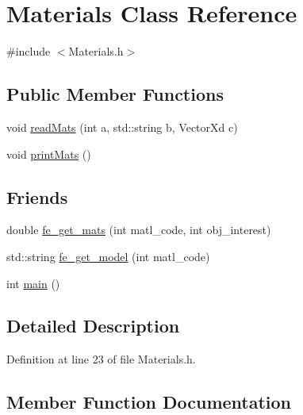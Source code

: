 \hypertarget{class_materials}{}\section{Materials Class Reference}
\label{class_materials}


{\ttfamily \#include $<$Materials.\+h$>$}

\subsection*{Public Member Functions}
\begin{DoxyCompactItemize}
\item 
void \hyperlink{class_materials_a06e59a5742730b2292d39b7488523505}{read\+Mats} (int a, std\+::string b, Vector\+Xd c)
\item 
void \hyperlink{class_materials_acce0e8fc2993ca136273747fd75b8fc1}{print\+Mats} ()
\end{DoxyCompactItemize}
\subsection*{Friends}
\begin{DoxyCompactItemize}
\item 
double \hyperlink{class_materials_af7ffbad6dfcc99fc88b130c1a7b1720a}{fe\+\_\+get\+\_\+mats} (int matl\+\_\+code, int obj\+\_\+interest)
\item 
std\+::string \hyperlink{class_materials_a34d6fb85943d945b7e8600d2ef4220d0}{fe\+\_\+get\+\_\+model} (int matl\+\_\+code)
\item 
int \hyperlink{class_materials_ae66f6b31b5ad750f1fe042a706a4e3d4}{main} ()
\end{DoxyCompactItemize}


\subsection{Detailed Description}


Definition at line 23 of file Materials.\+h.



\subsection{Member Function Documentation}
\mbox{\label{class_materials_acce0e8fc2993ca136273747fd75b8fc1}} 
